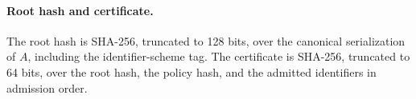 \paragraph{Root hash and certificate.} The root hash is SHA-256, truncated to 128 bits, over the canonical serialization of $A$, including the identifier-scheme tag. The certificate is SHA-256, truncated to 64 bits, over the root hash, the policy hash, and the admitted identifiers in admission order.
